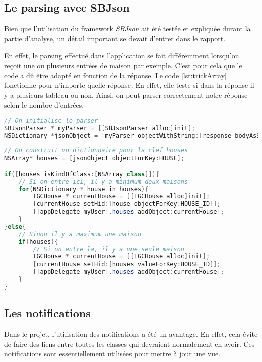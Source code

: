 \subsection{Le parsing avec SBJson} %
\label{sub:le_parsing_avec_sbjson}
Bien que l'utilisation du framework \emph{SBJson} ait été testée et expliquée durant la partie d'analyse, un détail important se devait d'entrer dans le rapport.

\medskip

En effet, le parsing effectué dans l'application se fait différemment lorsqu'on reçoit une ou plusieurs entrées de maison par exemple. C'est pour cela que le code a dû être adapté en fonction de la réponse. Le code \ref{lst:trickArray} fonctionne pour n'importe quelle réponse. En effet, elle teste si dans la réponse il y a plusieurs tableau ou non. Ainsi, on peut parser correctement notre réponse selon le nombre d'entrées.

\begin{lstlisting}[language={JAVA}, caption={Parsing d'une ou des maisons}, label={lst:trickArray}]
// On initialise le parser
SBJsonParser * myParser = [[SBJsonParser alloc]init];
NSDictionary *jsonObject = [myParser objectWithString:[response bodyAsString] error:nil];
            
// On construit un dictionnaire pour la clef houses
NSArray* houses = [jsonObject objectForKey:HOUSE];

if([houses isKindOfClass:[NSArray class]]){
	// Si on entre ici, il y a minimum deux maisons
	for(NSDictionary * house in houses){
    	IGCHouse * currentHouse = [[IGCHouse alloc]init];
        [currentHouse setHid:[house objectForKey:HOUSE_ID]];
        [[appDelegate myUser].houses addObject:currentHouse];
    }
}else{
	// Sinon il y a maximum une maison
	if(houses){
		// Si on entre la, il y a une seule maison
    	IGCHouse * currentHouse = [[IGCHouse alloc]init];
        [currentHouse setHid:[houses valueForKey:HOUSE_ID]];
        [[appDelegate myUser].houses addObject:currentHouse];
    }
}
\end{lstlisting}

\subsection{Les notifications} %
\label{sub:les_notifications}
Dans le projet, l'utilisation des notifications a été un avantage. En effet, cela évite de faire des liens entre toutes les classes qui devraient normalement en avoir. Ces notifications sont essentiellement utilisées pour mettre à jour une vue. 

